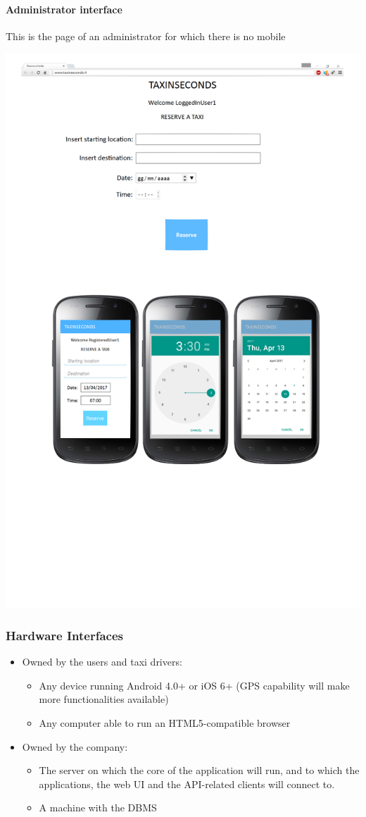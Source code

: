 \documentclass{article}
\begin{document}
\paragraph{Administrator interface}
This is the page of an administrator for which there is no mobile\\ 
\begin{center}
	\includegraphics[width=.8\textwidth,height=.8\textheight,keepaspectratio]{ReserveTaxi}
\end{center}
\clearpage
\subsubsection{Hardware Interfaces}
\begin{itemize}
	\item Owned by the users and taxi drivers:
		\begin{itemize}
			\item Any device running Android 4.0+ or iOS 6+ (GPS capability will make more functionalities available)
			\item Any computer able to run an HTML5-compatible browser 
		\end{itemize}
	\item Owned by the company:
		\begin{itemize}
			\item The server on which the core of the application will run, and to which the applications, 
				the web UI and the API-related clients will connect to.
			\item A machine with the DBMS 
		\end{itemize}
\end{itemize}
\end{document}

